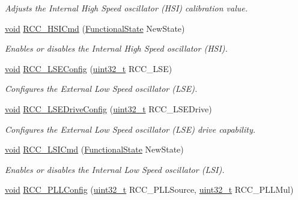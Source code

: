 \begin{DoxyCompactItemize}
\begin{DoxyCompactList}\small\item\em Adjusts the Internal High Speed oscillator (H\-S\-I) calibration value. \end{DoxyCompactList}\item 
\hyperlink{group___n_a_m_e_ga18028b8badbf1ea7e704ccac3c488e82}{void} \hyperlink{group___r_c_c___group1_ga0c6772a1e43765909495f57815ef69e2}{R\-C\-C\-\_\-\-H\-S\-I\-Cmd} (\hyperlink{group___exported__types_gac9a7e9a35d2513ec15c3b537aaa4fba1}{Functional\-State} New\-State)
\begin{DoxyCompactList}\small\item\em Enables or disables the Internal High Speed oscillator (H\-S\-I). \end{DoxyCompactList}\item 
\hyperlink{group___n_a_m_e_ga18028b8badbf1ea7e704ccac3c488e82}{void} \hyperlink{group___r_c_c___group1_ga8b2e5a38527f353eb72ac7038e56b0b0}{R\-C\-C\-\_\-\-L\-S\-E\-Config} (\hyperlink{stdint_8h_a435d1572bf3f880d55459d9805097f62}{uint32\-\_\-t} R\-C\-C\-\_\-\-L\-S\-E)
\begin{DoxyCompactList}\small\item\em Configures the External Low Speed oscillator (L\-S\-E). \end{DoxyCompactList}\item 
\hyperlink{group___n_a_m_e_ga18028b8badbf1ea7e704ccac3c488e82}{void} \hyperlink{group___r_c_c___group1_ga87297d3acc24b565ec461c42503af689}{R\-C\-C\-\_\-\-L\-S\-E\-Drive\-Config} (\hyperlink{stdint_8h_a435d1572bf3f880d55459d9805097f62}{uint32\-\_\-t} R\-C\-C\-\_\-\-L\-S\-E\-Drive)
\begin{DoxyCompactList}\small\item\em Configures the External Low Speed oscillator (L\-S\-E) drive capability. \end{DoxyCompactList}\item 
\hyperlink{group___n_a_m_e_ga18028b8badbf1ea7e704ccac3c488e82}{void} \hyperlink{group___r_c_c___group1_ga81e3ca29fd154ac2019bba6936d6d5ed}{R\-C\-C\-\_\-\-L\-S\-I\-Cmd} (\hyperlink{group___exported__types_gac9a7e9a35d2513ec15c3b537aaa4fba1}{Functional\-State} New\-State)
\begin{DoxyCompactList}\small\item\em Enables or disables the Internal Low Speed oscillator (L\-S\-I). \end{DoxyCompactList}\item 
\hyperlink{group___n_a_m_e_ga18028b8badbf1ea7e704ccac3c488e82}{void} \hyperlink{group___r_c_c___group1_ga0f67634cbe721f2c42f022d2a93229c8}{R\-C\-C\-\_\-\-P\-L\-L\-Config} (\hyperlink{stdint_8h_a435d1572bf3f880d55459d9805097f62}{uint32\-\_\-t} R\-C\-C\-\_\-\-P\-L\-L\-Source, \hyperlink{stdint_8h_a435d1572bf3f880d55459d9805097f62}{uint32\-\_\-t} R\-C\-C\-\_\-\-P\-L\-L\-Mul)

\end{DoxyCompactItemize}
